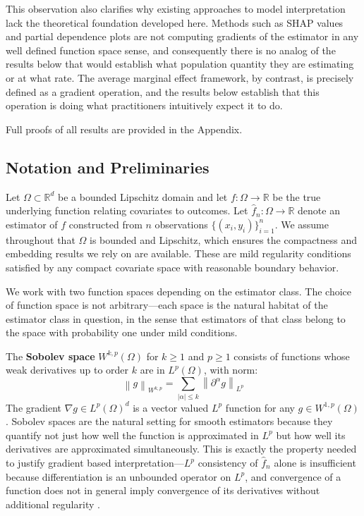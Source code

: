 \documentclass[12pt]{article}
\newcommand{\norm}[1]{\left\| #1 \right\|}
\newcommand{\R}{\mathbb{R}}
\newcommand{\Lp}{L^p(\Omega)}
\newcommand{\Wonep}{W^{1,p}(\Omega)}
\newcommand{\fn}{\hat{f}_n}
\begin{document}
	This observation also clarifies why existing approaches to model interpretation lack
	the theoretical foundation developed here. Methods such as SHAP values and partial
	dependence plots are not computing gradients of the estimator in any well defined
	function space sense, and consequently there is no analog of the results below that
	would establish what population quantity they are estimating or at what rate. The
	average marginal effect framework, by contrast, is precisely defined as a gradient
	operation, and the results below establish that this operation is doing what
	practitioners intuitively expect it to do.
	
	Full proofs of all results are provided in the Appendix.
	
	\subsection{Notation and Preliminaries}
	
	Let $\Omega \subset \R^d$ be a bounded Lipschitz domain and let $f: \Omega \to \R$
	be the true underlying function relating covariates to outcomes. Let
	$\fn: \Omega \to \R$ denote an estimator of $f$ constructed from $n$ observations
	$\{(x_i, y_i)\}_{i=1}^n$. We assume throughout that $\Omega$ is bounded and
	Lipschitz, which ensures the compactness and embedding results we rely on are
	available. These are mild regularity conditions satisfied by any compact covariate
	space with reasonable boundary behavior.
	
	We work with two function spaces depending on the estimator class. The choice of
	function space is not arbitrary---each space is the natural habitat of the estimator
	class in question, in the sense that estimators of that class belong to the space
	with probability one under mild conditions.
	
	The \textbf{Sobolev space} $W^{k,p}(\Omega)$ for $k \geq 1$ and $p \geq 1$
	consists of functions whose weak derivatives up to order $k$ are in $\Lp$, with
	norm:
	\begin{equation}
		\norm{g}_{W^{k,p}} = \sum_{|\alpha| \leq k} \norm{\partial^\alpha g}_{L^p}
	\end{equation}
	The gradient $\nabla g \in L^p(\Omega)^d$ is a vector valued $L^p$ function for any
	$g \in \Wonep$. Sobolev spaces are the natural setting for smooth estimators because
	they quantify not just how well the function is approximated in $L^p$ but how well
	its derivatives are approximated simultaneously. This is exactly the property needed
	to justify gradient based interpretation---$L^p$ consistency of $\fn$ alone is
	insufficient because differentiation is an unbounded operator on $L^p$, and
	convergence of a function does not in general imply convergence of its derivatives
	without additional regularity \citep[Chapter~5]{evans2010pde}.
	
\end{document}
